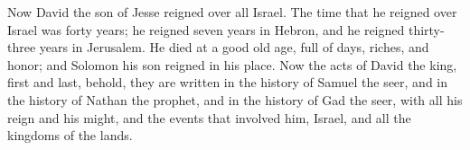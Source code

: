  Now David the son of Jesse reigned over all Israel.
 The time that he reigned over Israel was forty years; he
reigned seven years in Hebron, and he reigned thirty-three years in
Jerusalem.  He died at a good old age, full of days,
riches, and honor; and Solomon his son reigned in his place.
 Now the acts of David the king, first and last, behold,
they are written in the history of Samuel the seer, and in the history
of Nathan the prophet, and in the history of Gad the seer, 
with all his reign and his might, and the events that involved him,
Israel, and all the kingdoms of the lands.

